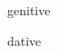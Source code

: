 \glsenablehyper

\renewcommand*{\glsclearpage}{}

\renewcommand{\acronymname}{Abkürzungsverzeichnis}


\glsaddkey
{genitive}%
{}%
{\glsentrygenitive}%
{\Glsentrygenitive}%
{\glsgen}%
{\Glsgen}%
{\GLSgen}%

\glsaddkey
{dative}%
{}%
{\glsentrydative}%
{\Glsentrydative}%
{\glsdative}%
{\Glsdative}%
{\GLSdative}%

